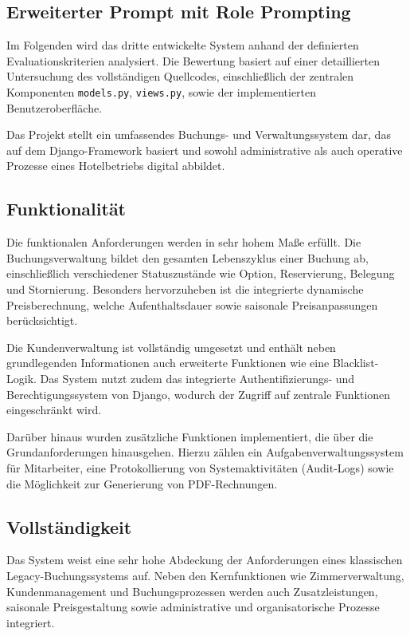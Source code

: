 \subsection{Erweiterter Prompt mit Role Prompting}

Im Folgenden wird das dritte entwickelte System anhand der definierten Evaluationskriterien analysiert. Die Bewertung basiert auf einer detaillierten Untersuchung des vollständigen Quellcodes, einschließlich der zentralen Komponenten \texttt{models.py}, \texttt{views.py}, sowie der implementierten Benutzeroberfläche.

Das Projekt stellt ein umfassendes Buchungs- und Verwaltungssystem dar, das auf dem Django-Framework basiert und sowohl administrative als auch operative Prozesse eines Hotelbetriebs digital abbildet.

\subsection{Funktionalität}

Die funktionalen Anforderungen werden in sehr hohem Maße erfüllt. Die Buchungsverwaltung bildet den gesamten Lebenszyklus einer Buchung ab, einschließlich verschiedener Statuszustände wie Option, Reservierung, Belegung und Stornierung. Besonders hervorzuheben ist die integrierte dynamische Preisberechnung, welche Aufenthaltsdauer sowie saisonale Preisanpassungen berücksichtigt.

Die Kundenverwaltung ist vollständig umgesetzt und enthält neben grundlegenden Informationen auch erweiterte Funktionen wie eine Blacklist-Logik. Das System nutzt zudem das integrierte Authentifizierungs- und Berechtigungssystem von Django, wodurch der Zugriff auf zentrale Funktionen eingeschränkt wird.

Darüber hinaus wurden zusätzliche Funktionen implementiert, die über die Grundanforderungen hinausgehen. Hierzu zählen ein Aufgabenverwaltungssystem für Mitarbeiter, eine Protokollierung von Systemaktivitäten (Audit-Logs) sowie die Möglichkeit zur Generierung von PDF-Rechnungen.

\subsection{Vollständigkeit}

Das System weist eine sehr hohe Abdeckung der Anforderungen eines klassischen Legacy-Buchungssystems auf. Neben den Kernfunktionen wie Zimmerverwaltung, Kundenmanagement und Buchungsprozessen werden auch Zusatzleistungen, saisonale Preisgestaltung sowie administrative und organisatorische Prozesse integriert.

